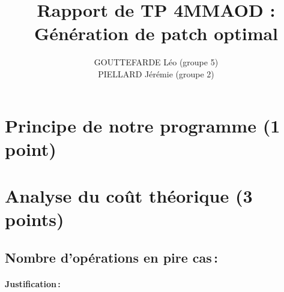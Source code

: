 \documentclass[a4paper, 10pt, french]{article}
\title{Rapport de TP 4MMAOD : Génération de patch optimal}
\author{
GOUTTEFARDE Léo (groupe 5)
\\ PIELLARD Jérémie (groupe 2)
}
\begin{document}
\maketitle


\section{Principe de notre  programme (1 point)}

\section{Analyse du coût théorique (3 points)}

  \subsection{Nombre  d'opérations en pire cas\,: }
    \paragraph{Justification\,: }
\end{document}
